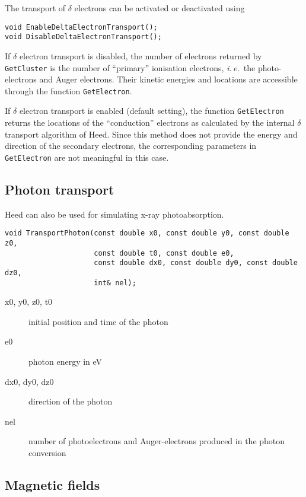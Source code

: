 The transport of \(\delta\) electrons can be activated or deactivated 
using
\begin{lstlisting}
void EnableDeltaElectronTransport();
void DisableDeltaElectronTransport();
\end{lstlisting} 

If \(\delta\) electron transport is disabled, 
the number of electrons returned by \texttt{GetCluster} is 
the number of ``primary'' ionisation electrons, 
\textit{i.\,e.}~the photo-electrons and Auger electrons. 
Their kinetic energies and locations are accessible 
through the function \texttt{GetElectron}.

If \(\delta\) electron transport is enabled (default setting), 
the function \texttt{GetElectron} returns the 
locations of the ``conduction'' electrons as calculated by the 
internal \(\delta\) transport algorithm of Heed. 
Since this method does not provide the energy and direction of the 
secondary electrons, the corresponding parameters in 
\texttt{GetElectron} are not meaningful in this case. 

\subsection{Photon transport}

Heed can also be used for simulating x-ray photoabsorption. 
\begin{lstlisting}
void TransportPhoton(const double x0, const double y0, const double z0,
                     const double t0, const double e0,
                     const double dx0, const double dy0, const double dz0,
                     int& nel);
\end{lstlisting}
\begin{description}
\item[x0, y0, z0, t0] initial position and time of the photon
\item[e0] photon energy in eV
\item[dx0, dy0, dz0] direction of the photon
\item[nel] number of photoelectrons and Auger-electrons produced 
           in the photon conversion
\end{description}

\subsection{Magnetic fields}

